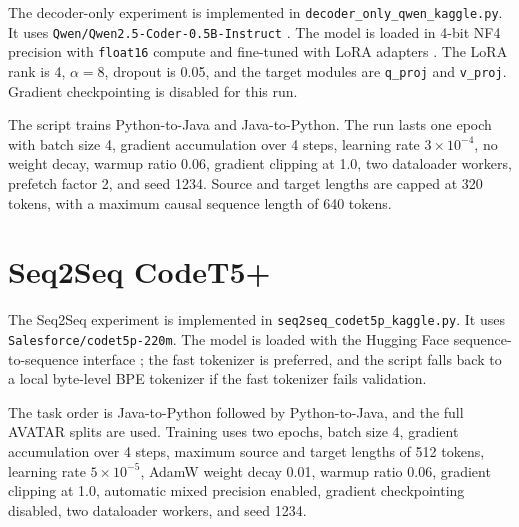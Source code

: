 \quad The decoder-only experiment is implemented in
\texttt{decoder\_only\_qwen\_kaggle.py}. It uses
\texttt{Qwen/}\allowbreak\texttt{Qwen2.5-Coder-0.5B-Instruct}
\cite{qwen2024qwen25coder05b}. The model is loaded in 4-bit NF4 precision with
\texttt{float16} compute and fine-tuned with LoRA adapters
\cite{hu2022lora,dettmers2023qlora}. The LoRA rank is 4, \(\alpha=8\), dropout
is 0.05, and the target modules are \texttt{q\_proj} and \texttt{v\_proj}.
Gradient checkpointing is disabled for this run.

The script trains Python-to-Java and Java-to-Python. The run lasts one epoch
with batch size 4, gradient accumulation over 4 steps, learning rate \(3
\times 10^{-4}\), no weight decay, warmup ratio 0.06, gradient clipping at 1.0,
two dataloader workers, prefetch factor 2, and seed 1234. Source and target
lengths are capped at 320 tokens, with a maximum causal sequence length of 640
tokens.

\section{Seq2Seq CodeT5+}

\quad The Seq2Seq experiment is implemented in
\texttt{seq2seq\_codet5p\_kaggle.py}. It uses
\texttt{Salesforce/}\allowbreak\texttt{codet5p-220m}. The model is loaded with
the Hugging Face sequence-to-sequence interface \cite{wolf2020transformers};
the fast tokenizer is preferred, and the script falls back to a local
byte-level BPE tokenizer if the fast tokenizer fails validation.

The task order is Java-to-Python followed by Python-to-Java, and the full
AVATAR splits are used. Training uses two epochs, batch size 4, gradient
accumulation over 4 steps, maximum source and target lengths of 512 tokens,
learning rate \(5 \times 10^{-5}\), AdamW weight decay 0.01, warmup ratio
0.06, gradient clipping at 1.0, automatic mixed precision enabled, gradient
checkpointing disabled, two dataloader workers, and seed 1234.
